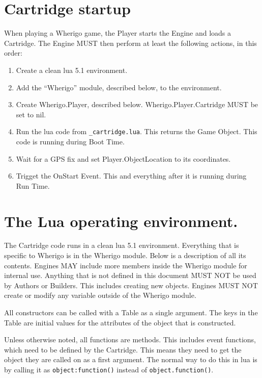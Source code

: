 \documentclass{article}
\begin{document}
\section{Cartridge startup}
When playing a Wherigo game, the Player starts the Engine and loads a
Cartridge. The Engine MUST then perform at least the following actions, in this
order:

\begin{enumerate}
\item Create a clean lua 5.1 environment.
\item Add the ``Wherigo'' module, described below, to the environment.
\item Create Wherigo.Player, described below. Wherigo.Player.Cartridge MUST be set to nil.
\item Run the lua code from \verb-_cartridge.lua-. This returns the Game Object. This code is running during Boot Time.
\item Wait for a GPS fix and set Player.ObjectLocation to its coordinates.
\item Trigget the OnStart Event. This and everything after it is running during Run Time.
\end{enumerate}


\section{The Lua operating environment.}

The Cartridge code runs in a clean lua 5.1 environment. Everything that is
specific to Wherigo is in the Wherigo module. Below is a description of all its
contents. Engines MAY include more members inside the Wherigo module for
internal use. Anything that is not defined in this document MUST NOT be used by
Authors or Builders. This includes creating new objects. Engines MUST NOT
create or modify any variable outside of the Wherigo module.

All constructors can be called with a Table as a single argument. The keys in
the Table are initial values for the attributes of the object that is
constructed.

Unless otherwise noted, all functions are methods. This includes event
functions, which need to be defined by the Cartridge.  This means they need to
get the object they are called on as a first argument. The normal way to do
this in lua is by calling it as \verb-object:function()- instead of
\verb-object.function()-.
\end{document}
